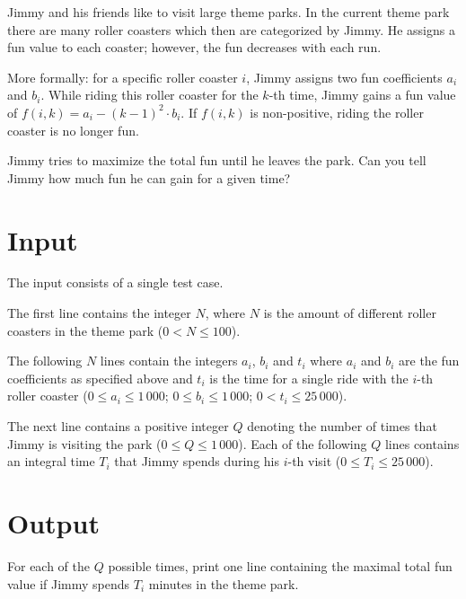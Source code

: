 Jimmy and his friends like to visit large theme parks. In the current theme
park there are many roller coasters which then are categorized by Jimmy. He
assigns a fun value to each coaster; however, the fun decreases with each
run.

More formally: for a specific roller coaster $i$, Jimmy assigns two fun coefficients
$a_i$ and $b_i$. While riding this roller coaster for the $k$-th time, Jimmy
gains a fun value of $f(i,k) = a_i - (k-1)^2 \cdot b_i$. If $f(i,k)$ is
non-positive, riding the roller coaster is no longer fun.

Jimmy tries to maximize the total fun until he leaves the park.
Can you tell Jimmy how much fun he can gain for a given time?

\section*{Input}
The input consists of a single test case.

The first line contains the integer $N$, where $N$ is the
amount of different roller coasters in the theme park ($0< N\le 100$).

The following $N$ lines contain the integers $a_i$, $b_i$ and $t_i$ where $a_i$
and $b_i$ are the fun coefficients as specified above and $t_i$ is the time for a
single ride with the $i$-th roller coaster ($0\le a_i \le 1\,000$; $0\le b_i
\le 1\,000$; $0 < t_i \le 25\,000$).

The next line contains a positive integer $Q$ denoting the number of times
that Jimmy is visiting the park ($0\le Q \le 1\,000$). Each of the following
$Q$ lines contains an integral time $T_i$ that Jimmy spends during his $i$-th
visit ($0\le T_i \le 25\,000$).

\section*{Output}
For each of the $Q$ possible times, print one line containing the maximal total fun
value if Jimmy spends $T_i$ minutes in the theme park.
